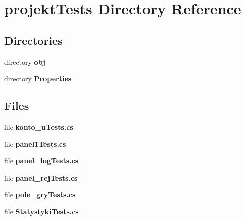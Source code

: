 \section{projekt\+Tests Directory Reference}
\label{dir_6bbc80205a602ecb78296fe15a3f8763}
\subsection*{Directories}
\begin{DoxyCompactItemize}
\item 
directory \textbf{ obj}
\item 
directory \textbf{ Properties}
\end{DoxyCompactItemize}
\subsection*{Files}
\begin{DoxyCompactItemize}
\item 
file \textbf{ konto\+\_\+u\+Tests.\+cs}
\item 
file \textbf{ panel1\+Tests.\+cs}
\item 
file \textbf{ panel\+\_\+log\+Tests.\+cs}
\item 
file \textbf{ panel\+\_\+rej\+Tests.\+cs}
\item 
file \textbf{ pole\+\_\+gry\+Tests.\+cs}
\item 
file \textbf{ Statystyki\+Tests.\+cs}
\end{DoxyCompactItemize}
